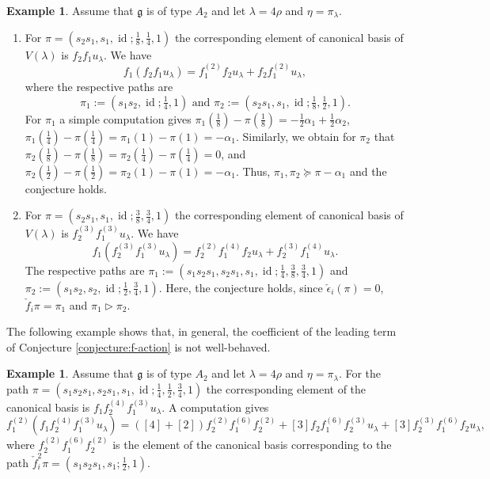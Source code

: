 \documentclass[final]{amsart}
\theoremstyle{plain}
\theoremstyle{definition}
\newtheorem{example}[corollary]{Example}
\newcommand{\frakg}{\mathfrak g}
\newcommand{\cf}{\check{f}}
\newcommand{\cepsilon}{\check{\epsilon}}
\DeclareMathOperator{\id}{id}
\begin{document}
\begin{example}
    Assume that $\frakg$ is of type $A_2$ and let $\lambda = 4\rho$ and $\eta = \pi_\lambda$.
    \begin{enumerate}
        \item For $\pi = (s_2s_1, s_1, \id; \frac18, \frac14, 1)$ the corresponding element of canonical basis of $V(\lambda)$ is $f_2f_1u_\lambda$.
        We have
        \[
            f_1 (f_2f_1 u_\lambda) = f_1^{(2)}f_2 u_\lambda + f_2 f_1^{(2)} u_\lambda,
        \]
        where the respective paths are
        \[
            \pi_1 := (s_1s_2, \id; \tfrac14, 1) \text{ and } \pi_2 := (s_2s_1, s_1, \id; \tfrac18, \tfrac12, 1).
        \]
        For $\pi_1$ a simple computation gives $\pi_1(\frac18) - \pi(\frac18) = -\frac12\alpha_1 + \frac12\alpha_2$, $\pi_1(\frac14) - \pi(\frac14) = \pi_1(1) - \pi(1) = -\alpha_1$.
        Similarly, we obtain for $\pi_2$ that $\pi_2(\frac18) - \pi(\frac18) = \pi_2(\frac14) - \pi(\frac14) = 0$, and $\pi_2(\frac12) - \pi(\frac12) = \pi_2(1) - \pi(1) = -\alpha_1$.
        Thus, $\pi_1, \pi_2 \succeq \pi - \alpha_1$ and the conjecture holds.
        \item For $\pi = (s_2s_1, s_1, \id; \tfrac38, \tfrac34, 1)$ the corresponding element of canonical basis of $V(\lambda)$ is $f_2^{(3)} f_1^{(3)} u_\lambda$.
        We have
        \[
            f_1 (f_2^{(3)}f_1^{(3)} u_\lambda) = f_2^{(2)} f_1^{(4)} f_2 u_\lambda + f_2^{(3)} f_1^{(4)} u_\lambda.
        \]
        The respective paths are $\pi_1 := (s_1s_2s_1, s_2s_1, s_1, \id; \frac14, \frac38, \frac34, 1)$ and $\pi_2 := (s_1s_2, s_2, \id; \frac12, \frac34, 1)$.
        Here, the conjecture holds, since $\cepsilon_i(\pi) = 0$, $\cf_i\pi = \pi_1$ and $\pi_1 \triangleright \pi_2$.
    \end{enumerate}
\end{example}

The following example shows that, in general, the coefficient of the leading term of Conjecture \ref{conjecture:f-action} is not well-behaved.

\begin{example}
    Assume that $\frakg$ is of type $A_2$ and let $\lambda = 4\rho$ and $\eta = \pi_\lambda$.
    For the path $\pi = (s_1s_2s_1, s_2s_1, s_1, \id; \frac14, \frac12, \tfrac34, 1)$ the corresponding element of the canonical basis is $f_1 f_2^{(4)} f_1^{(3)} u_\lambda$.
    A computation gives
    \[
        f_1^{(2)} (f_1 f_2^{(4)} f_1^{(3)} u_\lambda) = ([4] + [2]) f_2^{(2)} f_1^{(6)} f_2^{(2)} + [3] f_2 f_1^{(6)} f_2^{(3)} u_\lambda + [3] f_2^{(3)} f_1^{(6)} f_2 u_\lambda,
    \]
    where $f_2^{(2)} f_1^{(6)} f_2^{(2)}$ is the element of the canonical basis corresponding to the path $\cf_i^2\pi = (s_1s_2s_1, s_1; \tfrac12, 1)$.
\end{example}
\end{document}
